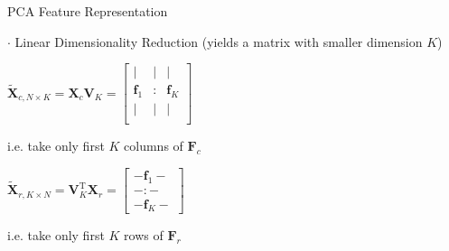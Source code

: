 \documentclass[mathserif, aspectratio=1610]{intbeamer}
\begin{document}
\begin{frame}[t]{PCA Feature Representation}
\begin{minipage}[t]{0.49\textwidth}
\end{minipage}

\vspace{1em}

$\cdot$ Linear Dimensionality Reduction (yields a matrix with smaller dimension $K$)

\begin{minipage}[t]{0.49\textwidth}
$\tilde{\bm{X}}_{c,N \times K} = \bm{X}_c \bm{V}_K =
\begin{bmatrix}
| & | & |\\
\bm{f}_1 & : & \bm{f}_{K}\\
| & | & |\\
\end{bmatrix}
$

i.e. take only first $K$ columns of $\bm{F}_c$
\end{minipage}
%
\begin{minipage}[t]{0.49\textwidth}
$\tilde{\bm{X}}_{r,K \times N} = \bm{V}_K^\mathrm{T} \bm{X}_r
=
\begin{bmatrix}
- \bm{f}_1 -\\
- : -\\
- \bm{f}_K -
\end{bmatrix}
$

i.e. take only first $K$ rows of $\bm{F}_r$
\end{minipage}

\end{frame}
\end{document}
